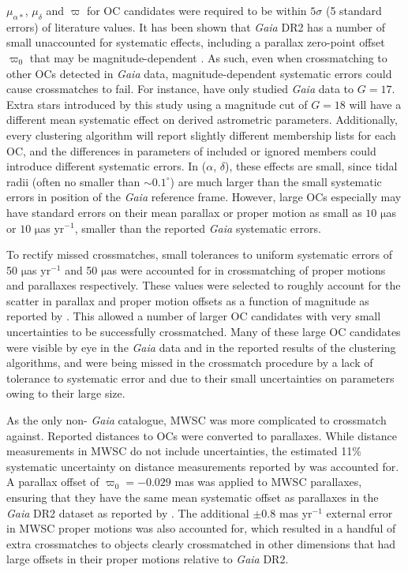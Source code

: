 $\mu_{\alpha*}$, $\mu_{\delta}$ and $\varpi$ for OC candidates were required to be within $5 \sigma$ (5 standard errors) of literature values. It has been shown that \emph{Gaia} DR2 has a number of small unaccounted for systematic effects, including a parallax zero-point offset $\varpi_0$ that may be magnitude-dependent \citep{lindegren_gaia_2018}. As such, even when crossmatching to other OCs detected in \emph{Gaia} data, magnitude-dependent systematic errors could cause crossmatches to fail. For instance, \cite{castro-ginard_hunting_2020} have only studied \emph{Gaia} data to $G=17$. Extra stars introduced by this study using a magnitude cut of $G=18$ will have a different mean systematic effect on derived astrometric parameters. Additionally, every clustering algorithm will report slightly different membership lists for each OC, and the differences in parameters of included or ignored members could introduce different systematic errors. In ($\alpha$, $\delta$), these effects are small, since tidal radii (often no smaller than $\sim0.1^{\circ}$) are much larger than the small systematic errors in position of the \emph{Gaia} reference frame. However, large OCs especially may have standard errors on their mean parallax or proper motion as small as $10$ $\mathrm{\mu}$as or $10$ $\mathrm{\mu}$as yr$^{-1}$, smaller than the reported \emph{Gaia} systematic errors.

To rectify missed crossmatches, small tolerances to uniform systematic errors of 50 $\mathrm{\mu}$as yr$^{-1}$ and 50 $\mathrm{\mu}$as were accounted for in crossmatching of proper motions and parallaxes respectively. These values were selected to roughly account for the scatter in parallax and proper motion offsets as a function of magnitude as reported by \cite{lindegren_gaia_2018}. This allowed a number of larger OC candidates with very small uncertainties \citep[particularly from the catalogue of][]{cantat-gaudin_clusters_2020} to be successfully crossmatched. Many of these large OC candidates were visible by eye in the \emph{Gaia} data and in the reported results of the clustering algorithms, and were being missed in the crossmatch procedure by a lack of tolerance to systematic error and due to their small uncertainties on parameters owing to their large size.

As the only non- \emph{Gaia}  catalogue, MWSC was more complicated to crossmatch against. Reported distances to OCs were converted to parallaxes. While distance measurements in MWSC do not include uncertainties, the estimated 11\% systematic uncertainty on distance measurements reported by \cite{kharchenko_global_2013} was accounted for. A parallax offset of $\varpi_0 = -0.029$ mas was applied to MWSC parallaxes, ensuring that they have the same mean systematic offset as parallaxes in the \emph{Gaia} DR2 dataset as reported by \cite{lindegren_gaia_2018}. The additional $\pm$0.8 mas yr$^{-1}$ external error in MWSC proper motions was also accounted for, which resulted in a handful of extra crossmatches to objects clearly crossmatched in other dimensions that had large offsets in their proper motions relative to \emph{Gaia} DR2.


